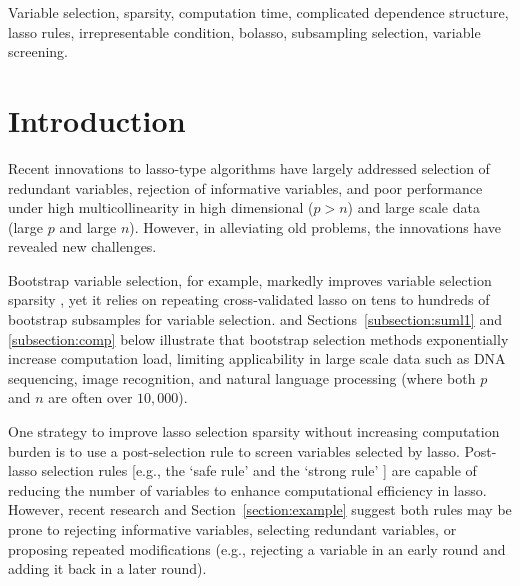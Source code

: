 \documentclass[11pt,review,authoryear]{elsarticle}
\begin{document}
\begin{keyword}
Variable selection, sparsity, computation time, complicated dependence structure, lasso rules, irrepresentable condition, bolasso, subsampling selection, variable screening.
\end{keyword}

\maketitle




\section{Introduction}

Recent innovations to lasso-type algorithms \citep{efronall04, friedman2007pathwise, friedman2010regularization} have largely addressed selection of redundant variables, rejection of informative variables, and poor performance under high multicollinearity in high dimensional ($p>n$) and large scale data (large $p$ and large $n$). However, in alleviating old problems, the innovations have revealed new challenges.

Bootstrap variable selection, for example, markedly improves variable selection sparsity \citep{bach2008bolasso, meinshausen2010stability}, yet it relies on repeating cross-validated lasso on tens to hundreds of bootstrap subsamples for variable selection. \citet{xu2012asymptotic} and Sections~\ref{subsection:suml1} and \ref{subsection:comp} below illustrate that bootstrap selection methods exponentially increase computation load, limiting applicability in large scale data such as DNA sequencing, image recognition, and natural language processing (where both $p$ and $n$ are often over $10,000$).

One strategy to improve lasso selection sparsity without increasing computation burden is to use a post-selection rule to screen variables selected by lasso. Post-lasso selection rules [e.g., the `safe rule' \citep{ghaoui2010safe} and the `strong rule' \citep{tibshirani2012strong}] are capable of reducing the number of variables to enhance computational efficiency in lasso. However, recent research \citep{wang2014safe, zeng2017efficient} and Section~\ref{section:example} suggest both rules may be prone to rejecting informative variables, selecting redundant variables, or proposing repeated modifications (e.g., rejecting a variable in an early round and adding it back in a later round).
\end{document}

